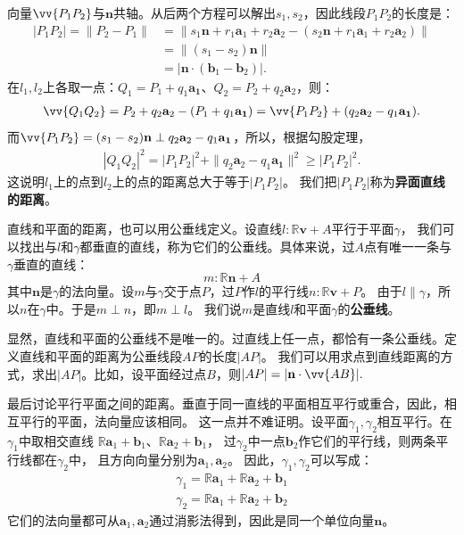 \documentclass[12pt,UTF8]{ctexbook}
\begin{document}
向量$\vv{P_1P_2}$与$\mathbf{n}$共轴。从后两个方程可以解出$s_1,s_2$，因此线段$P_1P_2$的长度是：
\begin{align*}
    |P_1P_2| = \|P_2 - P_1\| &= \|s_1\mathbf{n} + r_1\mathbf{a}_1 + r_2\mathbf{a}_2 - (s_2\mathbf{n} + r_1\mathbf{a}_1 + r_2\mathbf{a}_2)\|  \\
    &= \| (s_1 - s_2)\mathbf{n} \|  \\
    &= |\mathbf{n}\cdot(\mathbf{b}_1 - \mathbf{b}_2)|. 
\end{align*}
在$l_1,l_2$上各取一点：$Q_1 = P_1 + q_1\mathbf{a_1}$、$Q_2 = P_2 + q_2\mathbf{a}_2$，则：
\begin{align*}
    \vv{Q_1Q_2} = P_2 + q_2\mathbf{a}_2 - (P_1 + q_1\mathbf{a_1}) = \vv{P_1P_2}  + (q_2\mathbf{a}_2 - q_1\mathbf{a_1}).  
\end{align*}
而$\vv{P_1P_2} = (s_1 - s_2)\mathbf{n} \perp q_2\mathbf{a}_2 - q_1\mathbf{a_1}$，所以，根据勾股定理，
\begin{align*}
    |Q_1Q_2|^2 = |P_1P_2|^2 + \|q_2\mathbf{a}_2 - q_1\mathbf{a_1}\|^2 \geqslant |P_1P_2|^2.  
\end{align*}
这说明$l_1$上的点到$l_2$上的点的距离总大于等于$|P_1P_2|$。
我们把$|P_1P_2|$称为\textbf{异面直线的距离}。

直线和平面的距离，也可以用公垂线定义。设直线$l:\mathbb{R}\mathbf{v} + A$平行于平面$\gamma$，
我们可以找出与$l$和$\gamma$都垂直的直线，称为它们的公垂线。具体来说，过$A$点有唯一一条与$\gamma$垂直的直线：
$$ m:\mathbb{R}\mathbf{n} + A $$
其中$\mathbf{n}$是$\gamma$的法向量。设$m$与$\gamma$交于点$P$，过$P$作$l$的平行线$n:\mathbb{R}\mathbf{v} + P$。
由于$l\parallel\gamma$，所以$n$在$\gamma$中。于是$m\perp n$，即$m\perp l$。
我们说$m$是直线$l$和平面$\gamma$的\textbf{公垂线}。

显然，直线和平面的公垂线不是唯一的。过直线上任一点，都恰有一条公垂线。定义直线和平面的距离为公垂线段$AP$的长度$|AP|$。
我们可以用求点到直线距离的方式，求出$|AP|$。比如，设平面经过点$B$，则$|AP| = |\mathbf{n}\cdot \vv{AB}|.$

最后讨论平行平面之间的距离。垂直于同一直线的平面相互平行或重合，因此，相互平行的平面，法向量应该相同。
这一点并不难证明。设平面$\gamma_1,\gamma_2$相互平行。在$\gamma_1$中取相交直线
$\mathbb{R}\mathbf{a}_1 + \mathbf{b}_1$、$\mathbb{R}\mathbf{a}_2 + \mathbf{b}_1$，
过$\gamma_2$中一点$\mathbf{b}_2$作它们的平行线，则两条平行线都在$\gamma_2$中，
且方向向量分别为$\mathbf{a}_1,\mathbf{a}_2$。
因此，$\gamma_1,\gamma_2$可以写成：
\begin{align*}
    \gamma_1 = \mathbb{R}\mathbf{a}_1 + \mathbb{R}\mathbf{a}_2 + \mathbf{b}_1  \\
    \gamma_2 = \mathbb{R}\mathbf{a}_1 + \mathbb{R}\mathbf{a}_2 + \mathbf{b}_2 
\end{align*}
它们的法向量都可从$\mathbf{a}_1,\mathbf{a}_2$通过消影法得到，因此是同一个单位向量$\mathbf{n}$。
\end{document}
